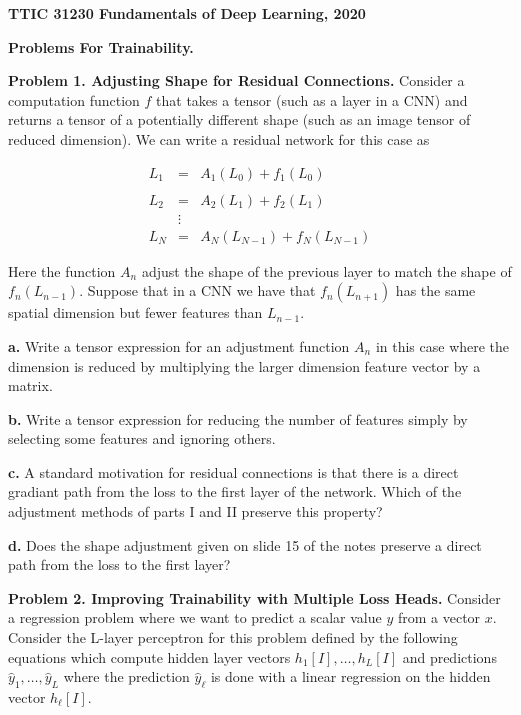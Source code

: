 \documentclass{article}
\begin{document}
\centerline{\bf TTIC 31230 Fundamentals of Deep Learning, 2020}
\medskip
\centerline{\bf Problems For Trainability.}

\bigskip

\medskip
{\bf Problem 1. Adjusting Shape for Residual Connections.} Consider a computation function $f$ that takes a tensor (such as a layer
in a CNN) and returns a tensor of a potentially different shape (such as an image
tensor of reduced dimension).  We can write a residual network for this case as 

\begin{eqnarray*}
  L_1 & = & A_1(L_0) + f_1(L_0) \\
  \\
  L_2 & = & A_2(L_1) + f_2(L_1) \\
        & \vdots & \\
  L_N & = & A_N(L_{N-1}) + f_N(L_{N-1})
\end{eqnarray*}


Here the function $A_n$ adjust the shape of the previous layer to match the shape of $f_n(L_{n-1})$.
Suppose that in a CNN we have that $f_n(L_{n+1})$ has the same spatial dimension but fewer features than $L_{n-1}$. 

\medskip
{\bf a.} Write a tensor expression for an adjustment function $A_n$ in this case where the dimension is reduced by multiplying the larger dimension feature vector by a matrix.

\medskip
{\bf b.} Write a tensor expression for reducing the number of features simply by selecting some features and ignoring others.

\medskip
{\bf c.} A standard motivation for residual connections is that there is a direct gradiant path from the loss to the first layer of the network.  Which of the adjustment methods of parts I and II preserve this property?

\medskip
{\bf d.} Does the shape adjustment given on slide 15 of the notes preserve a direct path from the loss to the first layer?

\medskip
{\bf Problem 2. Improving Trainability with Multiple Loss Heads.}  Consider a regression problem where we want to predict a scalar value $y$ from a vector $x$.
Consider the L-layer perceptron for this problem defined by the following equations
which compute hidden layer vectors $h_1[I], \ldots, h_L[I]$ and predictions $\hat{y}_1, \ldots, \hat{y}_L$ where
the prediction $\hat{y}_\ell$ is done with a linear regression on the hidden vector $h_\ell[I]$.
\end{document}
